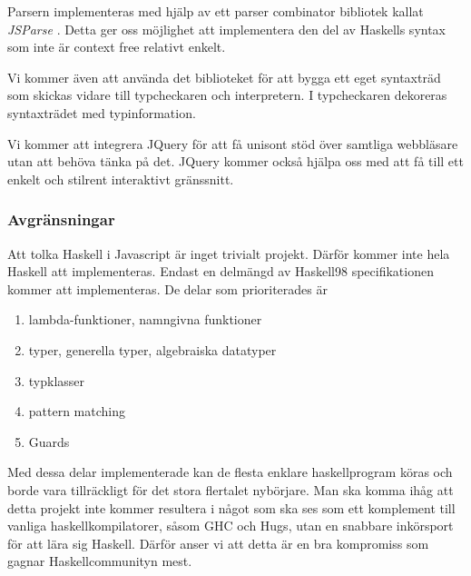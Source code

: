  Parsern implementeras med hjälp av ett parser combinator bibliotek kallat \emph{JSParse} \citep{jsparse}. Detta ger oss möjlighet att implementera den del av Haskells syntax som inte är context free relativt enkelt.

Vi kommer även att använda det biblioteket för att bygga ett eget syntaxträd som skickas vidare till typcheckaren och interpretern. I typcheckaren dekoreras syntaxträdet med typinformation.

Vi kommer att integrera JQuery \citep{jquery} för att få unisont stöd över samtliga webbläsare utan att behöva tänka på det. JQuery kommer också hjälpa oss med att få till ett enkelt och stilrent interaktivt gränssnitt.

\subsubsection{Avgränsningar}
Att tolka Haskell i Javascript är inget trivialt projekt. Därför kommer inte hela Haskell att implementeras. 
Endast en delmängd av Haskell98 specifikationen kommer att implementeras. De delar som prioriterades är
        \begin{enumerate}
            \item{lambda-funktioner, namngivna funktioner}
            \item{typer, generella typer, algebraiska datatyper}
            \item{typklasser}
            \item{pattern matching}
            \item{Guards}
            \end{enumerate}
Med dessa delar implementerade kan de flesta enklare haskellprogram köras och borde vara tillräckligt för det stora flertalet nybörjare. Man ska komma ihåg att detta projekt inte kommer resultera i något som ska ses som ett komplement till vanliga haskellkompilatorer, såsom GHC och Hugs, utan en snabbare inkörsport för att lära sig Haskell. Därför anser vi att detta är en bra kompromiss som gagnar Haskellcommunityn mest. %

